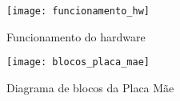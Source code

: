 \begin{figure}
	\centering
	\texttt{[image: funcionamento\_hw]}
	\caption{Funcionamento do hardware}
	\label{fig:func_hw}
\end{figure}

\begin{figure}
	\centering
	\texttt{[image: blocos\_placa\_mae]}
	\caption{Diagrama de blocos da Placa Mãe}
	\label{fig:blocos_placa_mae}
\end{figure}






